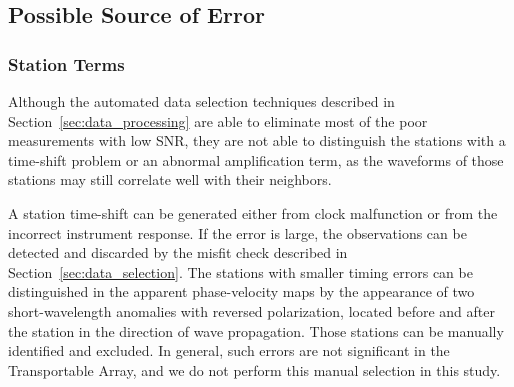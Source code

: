 

\subsection{Possible Source of Error}

\subsubsection{Station Terms}

Although the automated data selection techniques described in Section~\ref{sec:data_processing} are able to eliminate most of the poor measurements with low SNR, they are not able to distinguish the stations with a time-shift problem or an abnormal amplification term, as the waveforms of those stations may still correlate well with their neighbors.

A station time-shift can be generated either from clock malfunction or from the incorrect instrument response. If the error is large, the observations can be detected and discarded by the misfit check described in Section~\ref{sec:data_selection}. The stations with smaller timing errors can be distinguished in the apparent phase-velocity maps by the appearance of two short-wavelength anomalies with reversed polarization, located before and after the station in the direction of wave propagation. Those stations can be manually identified and excluded. In general, such errors are not significant in the Transportable Array, and we do not perform this manual selection in this study.

